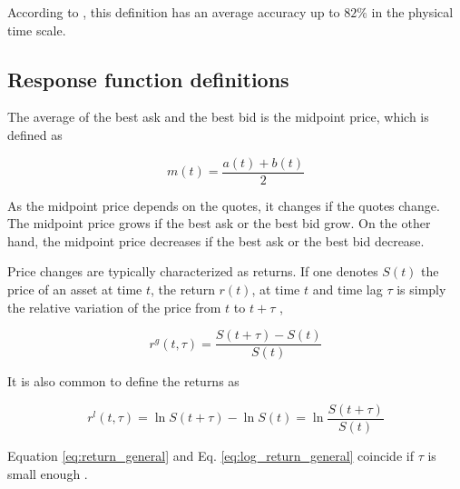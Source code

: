 According to \cite{Wang_2016_cross}, this definition has an average
accuracy up to $82\%$ in the physical time scale.


\subsection{Response function definitions}\label{subsec:response_def}
The average of the best ask and the best bid is the midpoint price, which is
defined as
\cite{subtle_nature,Bouchaud_2004,large_prices_changes,prop_order_book,stat_theory}

\begin{equation}\label{eq:midpoint_price}
    m\left(t\right)=\frac{a\left(t\right)+b\left(t\right)}{2}
\end{equation}

As the midpoint price depends on the quotes, it changes if the quotes change.
The midpoint price grows if the best ask or the best bid grow. On the other
hand, the midpoint price decreases if the best ask or the best bid
decrease.

Price changes are typically characterized as returns. If one denotes
$S\left( t\right)$ the price of an asset at time $t$, the return
$r\left(t\right)$, at time $t$ and time lag $\tau$ is simply the relative
variation of the price from $t$ to $t + \tau$
\cite{subtle_nature,empirical_facts,asynchrony_effects_corr,tick_size_impact,causes_epps_effect,non_stationarity},

\begin{equation}\label{eq:return_general}
    r^{g} \left(t, \tau \right) = \frac{S\left(t + \tau\right)
    - S\left(t\right)}{S\left(t\right)}
\end{equation}

It is also common to define the returns as
\cite{dissecting_cross,subtle_nature,empirical_facts,empirical_properties,large_prices_changes,pow_law_dist,theory_market_impact,spread_changes_affect,rand_mat,fluctions_market_friction}

\begin{equation}\label{eq:log_return_general}
    r^{l}\left(t,\tau\right) = \ln S\left(t + \tau\right)
    - \ln S\left(t\right) = \ln \frac{S\left(t + \tau\right)}{S\left(t\right)}
\end{equation}

Equation \ref{eq:return_general} and Eq. \ref{eq:log_return_general} coincide
if $\tau$ is small enough \cite{subtle_nature,empirical_facts}.

